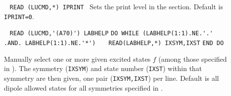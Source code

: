 \begin{description}
%
%
%
\item[] \verb| |\newline
\verb|READ (LUCMD,*) IPRINT |\newline
Sets the print level in the  section. Default is \verb+IPRINT=0+.
%
\item[] \verb| |\newline 
\verb|READ (LUCMD,'(A70)') LABHELP|\newline
\verb|DO WHILE (LABHELP(1:1).NE.'.' .AND. LABHELP(1:1).NE.'*')|\newline
\verb|   READ(LABHELP,*) IXSYM,IXST|\newline
\verb|END DO|

Manually select one or more given excited states $f$ (among those specified
in ). 
The symmetry (\verb+IXSYM+) and state number (\verb+IXST+)
within that symmetry are then given,
one pair (\verb|IXSYM,IXST|) per line.
Default is all dipole allowed states for all symmetries 
specified in .
%
%
%
%
%
%
%
\end{description}
